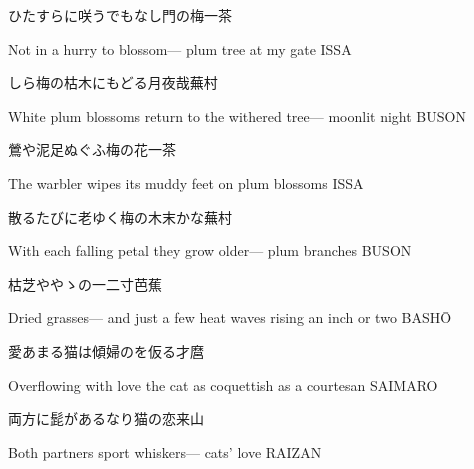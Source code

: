 \begin{haiku}
    {\FH ひたすらに咲うでもなし門の梅}\hfill{\FH 一茶}

    \vin{} Not in a hurry
    \vin{} \vin{} to blossom---
    \vin{} \vin{} \vin{} plum tree at my gate \hspace{\fill} ISSA
\end{haiku}

\begin{haiku}
    {\FH しら梅の枯木にもどる月夜哉}\hfill{\FH 蕪村}

    \vin{} White plum blossoms
    \vin{} \vin{} return to the withered tree---
    \vin{} \vin{} \vin{} moonlit night \hspace{\fill} BUSON
\end{haiku}

\begin{haiku}
    {\FH 鶯や泥足ぬぐふ梅の花}\hfill{\FH 一茶}

    \vin{} The warbler
    \vin{} \vin{} wipes its muddy feet
    \vin{} \vin{} \vin{} on plum blossoms \hspace{\fill} ISSA
\end{haiku}

\begin{haiku}
    {\FH 散るたびに老ゆく梅の木末かな}\hfill{\FH 蕪村}

    \vin{} With each falling petal
    \vin{} \vin{} they grow older---
    \vin{} \vin{} \vin{} plum branches \hspace{\fill} BUSON
\end{haiku}

\begin{haiku}
    {\FH 枯芝ややゝの一二寸}\hfill{\FH 芭蕉}

    \vin{} Dried grasses---
    \vin{} \vin{} and just a few heat waves
    \vin{} \vin{} \vin{} rising an inch or two \hspace{\fill} BASH\={O}
\end{haiku}

\begin{haiku}
    {\FH 愛あまる猫は傾婦のを仮る}\hfill{\FH 才麿}

    \vin{} Overflowing with love
    \vin{} \vin{} the cat as coquettish
    \vin{} \vin{} \vin{} as a courtesan \hspace{\fill} SAIMARO
\end{haiku}

\begin{haiku}
    {\FH 両方に髭があるなり猫の恋}\hfill{\FH 来山}

    \vin{} Both partners
    \vin{} \vin{} sport whiskers---
    \vin{} \vin{} \vin{} cats' love \hspace{\fill} RAIZAN
\end{haiku}

